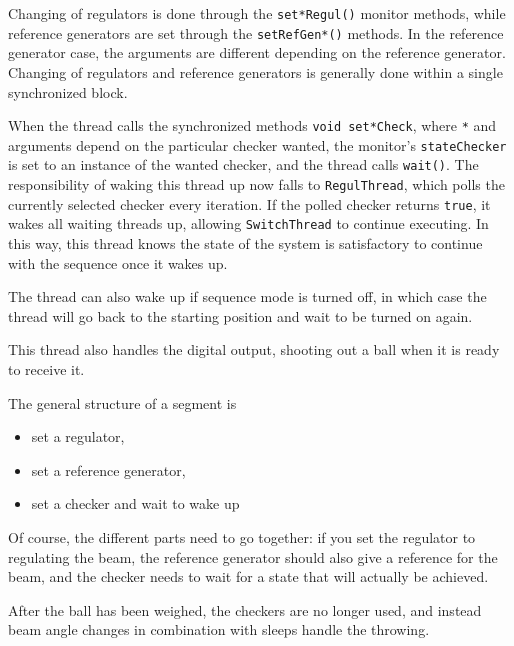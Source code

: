 Changing of regulators is done through the \texttt{set*Regul()} monitor methods, while reference generators are set through the \texttt{setRefGen*()} methods. In the reference generator case, the arguments are different depending on the reference generator. Changing of regulators and reference generators is generally done within a single synchronized block.

When the thread calls the synchronized methods \texttt{void set*Check}, where \texttt{*} and arguments depend on the particular checker wanted, the monitor's \texttt{stateChecker} is set to an instance of the wanted checker, and the thread calls \texttt{wait()}. The responsibility of waking this thread up now falls to \texttt{RegulThread}, which polls the currently selected checker every iteration. If the polled checker returns \texttt{true}, it wakes all waiting threads up, allowing \texttt{SwitchThread} to continue executing. In this way, this thread knows the state of the system is satisfactory to continue with the sequence once it wakes up.

The thread can also wake up if sequence mode is turned off, in which case the thread will go back to the starting position and wait to be turned on again.

This thread also handles the digital output, shooting out a ball when it is ready to receive it.

The general structure of a segment is
\begin{itemize}
\item set a regulator,
\item set a reference generator,
\item set a checker and wait to wake up
\end{itemize}

Of course, the different parts need to go together: if you set the regulator to regulating the beam, the reference generator should also give a reference for the beam, and the checker needs to wait for a state that will actually be achieved.

After the ball has been weighed, the checkers are no longer used, and instead beam angle changes in combination with sleeps handle the throwing.

